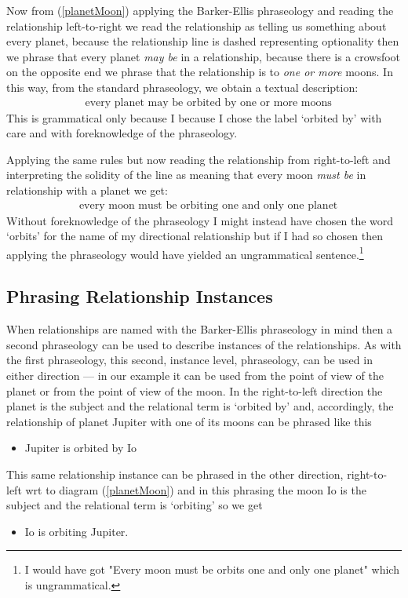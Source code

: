 Now from (\ref{planetMoon}) applying the Barker-Ellis  phraseology and reading the 
relationship left-to-right we read the relationship as telling us something about every planet, because the relationship line is dashed representing optionality then we phrase that every planet \textit{may be} 
in a relationship,
because there is a crowsfoot on the opposite end we phrase that the relationship is to 
\textit{one or more} moons.  In this way, from the standard phraseology, we obtain a textual description:
\begin{align}
&\mbox{every planet may be orbited by one or more moons} 
\end{align}
This is grammatical only because I 
because I chose the label `orbited by' with care and with foreknowledge of the  phraseology.
 
Applying the same rules but now reading  the relationship from right-to-left and interpreting the solidity of the line as 
 meaning that every moon \textit{must be} in relationship with a planet we get:
\begin{align}
&\mbox{every moon must be orbiting  one and only one planet} 
\end{align}
Without foreknowledge of the phraseology I might instead have chosen the word `orbits' for the name of my directional relationship but if I had so chosen then applying the phraseology would have yielded an ungrammatical sentence.\footnote{I would have got "Every moon must be orbits one and only one planet" which is ungrammatical.}
\subsection*{Phrasing Relationship Instances}
\mynote
When relationships are named with the 
Barker-Ellis phraseology in mind  then a second phraseology can be used to describe instances of the relationships. 
As with the first phraseology, this second, instance level, phraseology,
 can be used in either direction
 --- in our example it can be used from the point of view
of the planet or from the point of view of the moon.
In the right-to-left direction the planet is the subject and the relational term is
`orbited by' and, accordingly, the relationship of planet Jupiter with one of its moons can be phrased like this
\begin{itemize}
\renewcommand\labelitemi{--}
\item Jupiter is orbited by Io
\end{itemize}

This same relationship instance can be phrased in the other direction, right-to-left wrt to diagram (\ref{planetMoon}) and in this phrasing the moon Io is the subject and the relational term is `orbiting' so we get
\begin{itemize}
\renewcommand\labelitemi{--}
\item Io is orbiting  Jupiter.
\end{itemize}

